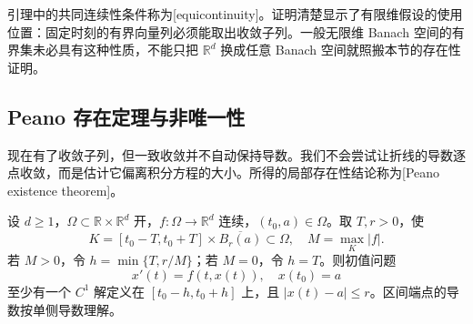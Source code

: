 引理中的共同连续性条件称为[equicontinuity]。证明清楚显示了有限维假设的使用位置：固定时刻的有界向量列必须能取出收敛子列。一般无限维 Banach 空间的有界集未必具有这种性质，不能只把 \(\mathbb R^d\) 换成任意 Banach 空间就照搬本节的存在性证明。

\subsection{Peano 存在定理与非唯一性}
\label{b2:subsec:ode-peano-proof}

现在有了收敛子列，但一致收敛并不自动保持导数。我们不会尝试让折线的导数逐点收敛，而是估计它偏离积分方程的大小。所得的局部存在性结论称为[Peano existence theorem]。

\begin{theorem}[Peano]\label{b2:thm:ode-peano}
设 \(d\geq1\)，\(\Omega\subset\mathbb R\times\mathbb R^d\) 开，\(f:\Omega\to\mathbb R^d\) 连续，\((t_0,a)\in\Omega\)。取 \(T,r>0\)，使
\[
 K=[t_0-T,t_0+T]\times\overline{B_r(a)}\subset\Omega,
 \quad M=\max_K|f|.
\]
若 \(M>0\)，令 \(h=\min\{T,r/M\}\)；若 \(M=0\)，令 \(h=T\)。则初值问题
\[
 x'(t)=f(t,x(t)),\quad x(t_0)=a
\]
至少有一个 \(C^1\) 解定义在 \([t_0-h,t_0+h]\) 上，且 \(|x(t)-a|\leq r\)。区间端点的导数按单侧导数理解。
\end{theorem}
